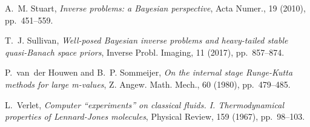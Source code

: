 \documentclass[10pt]{article}
\begin{document}
\begin{thebibliography}{10}
	{\sc A.~M. Stuart}, {\em Inverse problems: a {B}ayesian perspective}, Acta
	Numer., 19 (2010), pp.~451--559.
	
	{\sc T.~J. Sullivan}, {\em Well-posed {B}ayesian inverse problems and
		heavy-tailed stable quasi-{B}anach space priors}, Inverse Probl. Imaging, 11
	(2017), pp.~857--874.
	
	{\sc P.~van~der Houwen and B.~P. Sommeijer}, {\em On the internal stage
		{R}unge-{K}utta methods for large m-values}, Z. Angew. Math. Mech., 60
	(1980), pp.~479--485.
	
	{\sc L.~Verlet}, {\em Computer ``experiments'' on classical fluids. {I}.
		{T}hermodynamical properties of {L}ennard-{J}ones molecules}, Physical
	Review, 159 (1967), pp.~98--103.
	
\end{thebibliography}
\end{document}
